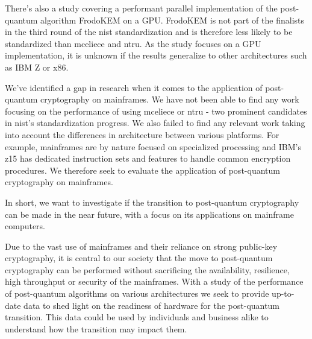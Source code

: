 There's also a study covering a performant parallel implementation of the post-quantum algorithm FrodoKEM on a GPU. FrodoKEM is not part of the finalists in the third round of the \gls{nist} standardization and is therefore less likely to be standardized than \gls{mceliece} and \gls{ntru}\cite{nist2020}. As the study focuses on a GPU implementation, it is unknown if the results generalize to other architectures such as IBM Z or x86.%

We've identified a gap in research when it comes to the application of post-quantum cryptography on mainframes. We have not been able to find any work focusing on the performance of using \gls{mceliece} or \gls{ntru} - two prominent candidates in \gls{nist}'s standardization progress. We also failed to find any relevant work taking into account the differences in architecture between various platforms. For example, mainframes are by nature focused on specialized processing and IBM's z15 has dedicated instruction sets and features to handle common encryption procedures\cite{ibm2020:quantum-computer}. We therefore seek to evaluate the application of post-quantum cryptography on mainframes.

In short, we want to investigate if the transition to post-quantum cryptography can be made in the near future, with a focus on its applications on mainframe computers.

Due to the vast use of mainframes and their reliance on strong public-key cryptography, it is central to our society that the move to post-quantum cryptography can be performed without sacrificing the availability, resilience, high throughput or security of the mainframes. With a study of the performance of post-quantum algorithms on various architectures we seek to provide up-to-date data to shed light on the readiness of hardware for the post-quantum transition. This data could be used by individuals and business alike to understand how the transition may impact them.


